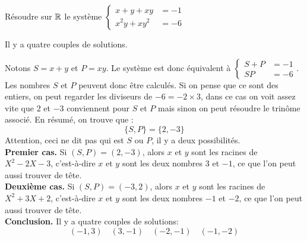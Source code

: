 \begin{exo}
Résoudre sur $\mathbb R$ le système $\left\{\begin{matrix}
x+y+xy &=-1\\
x^2y+xy^2 &=-6
\end{matrix}\right.$
\begin{hint}
Il y a quatre couples de solutions.
\end{hint}
\begin{sol}
Notons $S=x+y$ et $P=xy$. Le système est donc équivalent à $
\begin{cases}
S+P &=-1\\
SP &=-6
\end{cases}
$.
Les nombres $S$ et $P$ peuvent donc être calculés. Si on pense que ce sont des entiers, on peut regarder les diviseurs de $-6=-2\times3$, dans ce cas on voit assez vite que $2$ et $-3$ conviennent pour $S$ et $P$ mais sinon on peut résoudre le trinôme associé. En résumé, on trouve que :
\[\{S,P\}=\{2,-3\}\]
Attention, ceci ne dit pas qui est $S$ ou $P$, il y a deux possibilités.\\

\noindent\textbf{Premier cas.} Si $(S,P)=(2,-3)$, alors $x$ et $y$ sont les racines de $X^2-2X-3$, c'est-à-dire $x$ et $y$ sont les deux nombres $3$ et $-1$, ce que l'on peut aussi trouver de tête.\\

\noindent\textbf{Deuxième cas.} Si $(S,P)=(-3,2)$, alors $x$ et $y$ sont les racines de $X^2+3X+2$, c'est-à-dire $x$ et $y$ sont les deux nombres $-1$ et $-2$, ce que l'on peut aussi trouver de tête.\\

\noindent\textbf{Conclusion.} Il y a quatre couples de solutions:
\[ (-1,3)\quad (3,-1) \quad (-2,-1) \quad (-1,-2)\]
\end{sol}
\end{exo}

